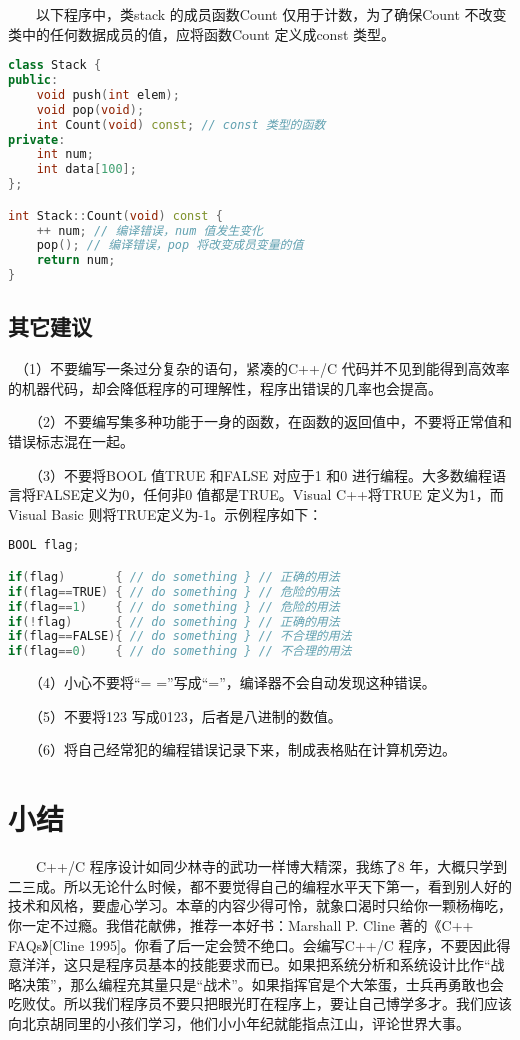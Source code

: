 \documentclass[11pt]{article}
\begin{document}
　　以下程序中，类stack 的成员函数Count 仅用于计数，为了确保Count 不改变类中的任何数据成员的值，应将函数Count 定义成const 类型。
\begin{lstlisting}[language=c++]
class Stack {
public:
    void push(int elem);
    void pop(void);
    int Count(void) const; // const 类型的函数
private:
    int num;
    int data[100];
};

int Stack::Count(void) const {
    ++ num; // 编译错误，num 值发生变化
    pop(); // 编译错误，pop 将改变成员变量的值
    return num;
}
\end{lstlisting}
\subsection{其它建议}
\label{sec-2-5}

　（1）不要编写一条过分复杂的语句，紧凑的C++/C 代码并不见到能得到高效率的机器代码，却会降低程序的可理解性，程序出错误的几率也会提高。

　　（2）不要编写集多种功能于一身的函数，在函数的返回值中，不要将正常值和错误标志混在一起。

　　（3）不要将BOOL 值TRUE 和FALSE 对应于1 和0 进行编程。大多数编程语言将FALSE定义为0，任何非0 值都是TRUE。Visual C++将TRUE 定义为1，而Visual Basic 则将TRUE定义为-1。示例程序如下：

\begin{lstlisting}[language=c++]
BOOL flag;

if(flag)       { // do something } // 正确的用法
if(flag==TRUE) { // do something } // 危险的用法
if(flag==1)    { // do something } // 危险的用法
if(!flag)      { // do something } // 正确的用法
if(flag==FALSE){ // do something } // 不合理的用法
if(flag==0)    { // do something } // 不合理的用法
\end{lstlisting}

　　（4）小心不要将“= =”写成“=”，编译器不会自动发现这种错误。

　　（5）不要将123 写成0123，后者是八进制的数值。

　　（6）将自己经常犯的编程错误记录下来，制成表格贴在计算机旁边。
\section{小结}
\label{sec-3}

　　C++/C 程序设计如同少林寺的武功一样博大精深，我练了8 年，大概只学到二三成。所以无论什么时候，都不要觉得自己的编程水平天下第一，看到别人好的技术和风格，要虚心学习。本章的内容少得可怜，就象口渴时只给你一颗杨梅吃，你一定不过瘾。我借花献佛，推荐一本好书：Marshall P. Cline 著的《C++ FAQs》[Cline 1995]。你看了后一定会赞不绝口。会编写C++/C 程序，不要因此得意洋洋，这只是程序员基本的技能要求而已。如果把系统分析和系统设计比作“战略决策”，那么编程充其量只是“战术”。如果指挥官是个大笨蛋，士兵再勇敢也会吃败仗。所以我们程序员不要只把眼光盯在程序上，要让自己博学多才。我们应该向北京胡同里的小孩们学习，他们小小年纪就能指点江山，评论世界大事。
\end{document}
